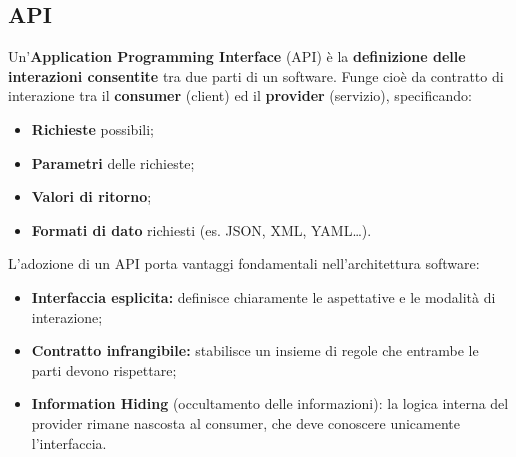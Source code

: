 \documentclass[12pt]{article}
\begin{document}
\subsection{API}
Un'\textbf{Application Programming Interface} (API) è la \textbf{definizione delle interazioni consentite} tra due parti di un software. 
Funge cioè da contratto di interazione tra il \textbf{consumer} (client) ed il \textbf{provider} (servizio), specificando:
\begin{itemize}
  \item \textbf{Richieste} possibili;
  \item \textbf{Parametri} delle richieste;
  \item \textbf{Valori di ritorno};
  \item \textbf{Formati di dato} richiesti (es. JSON, XML, YAML\dots).
\end{itemize}
L'adozione di un API porta vantaggi fondamentali nell'architettura software:
\begin{itemize}
  \item \textbf{Interfaccia esplicita:} definisce chiaramente le aspettative e le modalità di interazione;
  \item \textbf{Contratto infrangibile:} stabilisce un insieme di regole che entrambe le parti devono rispettare;
  \item \textbf{Information Hiding} (occultamento delle informazioni): la logica interna del provider rimane nascosta al consumer, che deve conoscere unicamente l'interfaccia.
\end{itemize}
\end{document}
